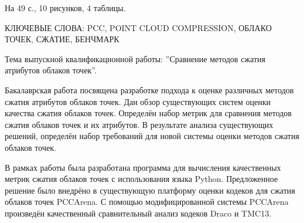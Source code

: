 На 49 с., 10 рисунков, 4 таблицы.

КЛЮЧЕВЫЕ СЛОВА: PCC, POINT CLOUD COMPRESSION, ОБЛАКО ТОЧЕК, СЖАТИЕ, БЕНЧМАРК

Тема выпускной квалификационной работы: ''Сравнение методов сжатия атрибутов облаков точек''.

Бакалаврская работа посвящена разработке подхода к оценке различных методов
сжатия атрибутов облаков точек. Дан обзор существующих систем оценки качества
сжатия облаков точек. Определён набор метрик для сравнения методов сжатия
облаков точек и их атрибутов. В результате анализа существующих решений,
определён набор требований для новой системы оценки методов сжатия облаков
точек.

В рамках работы была разработана программа для вычисления качественных метрик
сжатия облаков точек с использования языка Python. Предложенное решение было
внедрёно в существующую платформу оценки кодеков для сжатия облаков точек
PCCArena. С помощью модифицированной системы PCCArena произведён качественный
сравнительный анализ кодеков Draco и TMC13.

